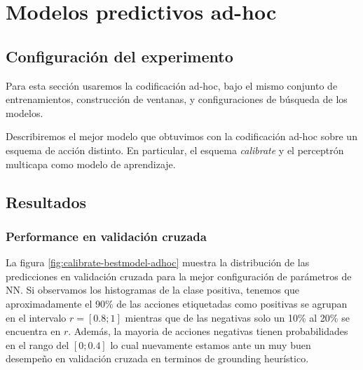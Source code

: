 

\section{Modelos predictivos ad-hoc}
\label{exp:wb}

\subsection{Configuración del experimento}

Para esta sección usaremos la codificación ad-hoc, bajo el mismo conjunto de
entrenamientos, construcción de ventanas, y configuraciones de búsqueda de los
modelos.

Describiremos el mejor modelo que obtuvimos con la codificación ad-hoc sobre un
esquema de acción distinto. En particular, el esquema \emph{calibrate} y el
perceptrón multicapa como modelo de aprendizaje.

\subsection{Resultados}

\subsubsection{Performance en validación cruzada}

La figura \ref{fig:calibrate-bestmodel-adhoc} muestra la distribución de las
predicciones en validación cruzada para la mejor configuración de parámetros de
NN. Si observamos los histogramas de la clase positiva, tenemos que aproximadamente
el 90\% de las acciones etiquetadas como positivas se agrupan en el intervalo $r
= [0.8; 1]$ mientras que de las negativas solo un 10\% al 20\% se encuentra en
$r$. Además, la mayoria de acciones negativas tienen probabilidades en el rango
del $[0;0.4]$ lo cual nuevamente estamos ante un muy buen desempeño en
validación cruzada en terminos de grounding heurístico.

